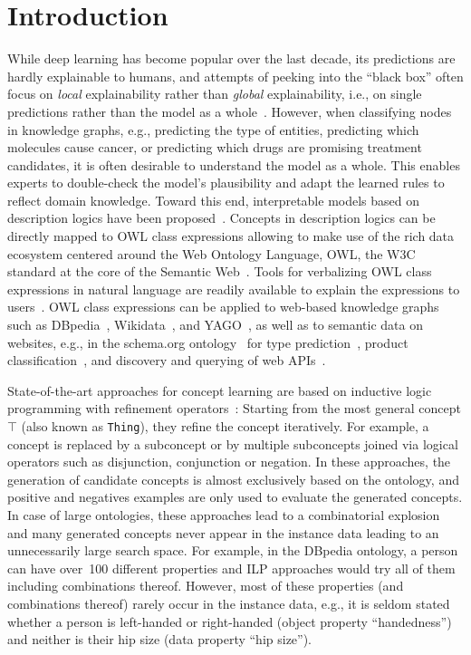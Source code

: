 \section{Introduction}%
\label{sec:introduction}

While deep learning has become popular over the last decade, its predictions are hardly explainable to humans, and attempts of peeking into the ``black box'' often focus on \emph{local} explainability rather than \emph{global} explainability, i.e., on single predictions rather than the model as a whole~\citep{Guidotti2019Survey}. However, when classifying nodes in knowledge graphs, e.g., predicting the type of entities, predicting which molecules cause cancer, or predicting which drugs are promising treatment candidates, it is often desirable to understand the model as a whole. This enables experts to double-check the model's plausibility and adapt the learned rules to reflect domain knowledge. Toward this end, interpretable models based on description logics have been proposed~\citep{Lehmann2009DL-Learner,Tran2017Parallel,Westphal2019SML-Bench}. Concepts in description logics can be directly mapped to OWL class expressions allowing to make use of the rich data ecosystem centered around the Web Ontology Language, OWL, the W3C standard at the core of the Semantic Web~\cite{Li2021Computing, Hogan2021Knowledge}. Tools for verbalizing OWL class expressions in natural language are readily available to explain the expressions to users~\citep{Moussallem2020NABU, Moussallem2020Generating, Ngonga2019Holistic}. OWL class expressions can be applied to web-based knowledge graphs such as DBpedia~\cite{Auer2007DBpedia}, Wikidata~\cite{Vrandecic2014Wikidata}, and YAGO~\cite{Suchanek2007Yago}, as well as to semantic data on websites, e.g., in the schema.org ontology~\cite{Hernich2015Schema.org} for type prediction~\cite[cf.][]{Paulheim2013Type, Zahera2021ASSET}, product classification~\cite{Zhang2019Product}, and discovery and querying of web APIs~\cite{Michel2019Enabling,Wolters2017Linking}. 

State-of-the-art approaches for concept learning are based on inductive logic programming with refinement operators~\citep{Fanizzi2018DLFoil,Lehmann2009DL-Learner,Lehmann2010Concept}: Starting from the most general concept $\top$ (also known as \texttt{Thing}), they refine the concept iteratively. For example, a concept is replaced by a subconcept or by multiple subconcepts joined via logical operators such as disjunction, conjunction or negation. In these approaches, the generation of candidate concepts is almost exclusively based on the ontology, and positive and negatives examples are only used to evaluate the generated concepts. In case of large ontologies, these approaches lead to a combinatorial explosion and many generated concepts never appear in the instance data leading to an unnecessarily large search space. For example, in the DBpedia ontology, a person can have over~100 different properties and ILP approaches would try all of them including combinations thereof. However, most of these properties (and combinations thereof) rarely occur in the instance data, e.g., it is seldom stated whether a person is left-handed or right-handed (object property ``handedness'') and neither is their hip size (data property ``hip size'').

